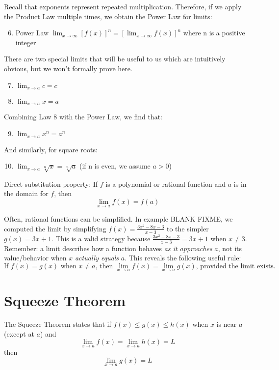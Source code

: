 Recall that exponents represent repeated multiplication. Therefore, if we apply the Product Law multiple times, we obtain the Power Law for limits:
\begin{enumerate}
    \setcounter{enumi}{5}
    \item Power Law $\lim_{x\to\infty} \left[f(x)\right]^n = \left[\lim_{x\to\infty}f(x)\right]^n$ where n is a positive integer
\end{enumerate}
There are two special limits that will be useful to us which are intuitively obvious, but we won't formally prove here.  
\begin{enumerate}
    \setcounter{enumi}{6}
    \item $\lim_{x\to a} \textit{c} = \textit{c}$
    \item $\lim_{x\to a} x = a$
\end{enumerate}
Combining Law 8 with the Power Law, we find that:
\begin{enumerate}
\setcounter{enumi}{8}
    \item $\lim_{x\to a} x^n = a^n$
\end{enumerate}
And similarly, for square roots:
\begin{enumerate}
    \setcounter{enumi}{9}
    \item $\lim_{x\to a} \sqrt[n]{x} = \sqrt[n]{a}$ (if n is even, we assume $a > 0$)
\end{enumerate}

Direct substitution property: If $f$ is a polynomial or rational function and $a$ is in the domain for $f$, then $$\lim_{x \to a}f(x) = f(a)$$

Often, rational functions can be simplified. In example BLANK FIXME, we computed the limit by simplifying $f(x) = \frac{3x^2-8x-3}{x-3}$ to the simpler $g(x) = 3x+1$. This is a valid strategy because $\frac{3x^2-8x-3}{x-3} = 3x+1$ when $x \neq 3$. Remember: a limit describes how a function behaves \textit{as it approaches} $a$, not its value/behavior when $x$ \textit{actually equals} $a$. This reveals the following useful rule: $$\text{If } f(x)=g(x) \text{ when } x \neq a \text{, then } \lim_{x \to a}f(x) = \lim_{x \to a}g(x) \text{, provided the limit exists.}$$

\section{Squeeze Theorem}

The Squeeze Theorem states that if $f(x) \leq g(x) \leq h(x)$ when $x$ is near $a$ (except at $a$) and $$\lim_{x \to a}f(x)=\lim_{x \to a}h(x) = L$$ then $$\lim_{x \to a}g(x) = L$$

